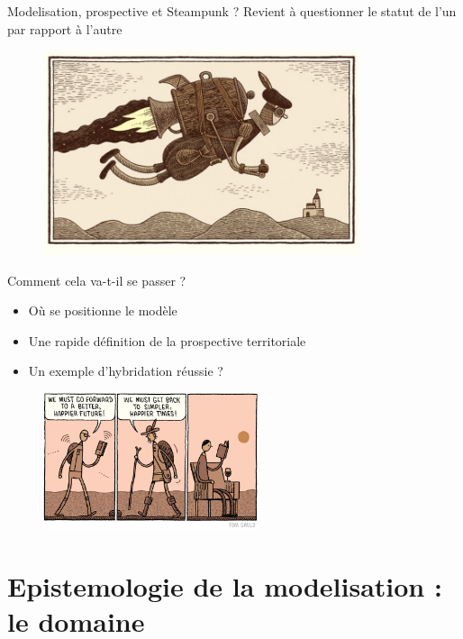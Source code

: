 \documentclass[newPxFont]{beamer}
\begin{document}
\begin{frame}[c]{Modelisation, prospective et Steampunk ?}
  \vspace{-1cm}
  Revient à questionner le statut de l'un par rapport à l'autre
  \begin{figure}
    \includegraphics[height=6cm]{img/a_Tom-Gauld-jetpack.jpg}
  \end{figure}
\end{frame}

\begin{frame}[c]{Comment cela va-t-il se passer ?}
  \vspace{-1cm}
  \begin{itemize}
    \item Où se positionne le modèle
    \item Une rapide définition de la prospective territoriale
    \item Un exemple d'hybridation réussie ?
  \end{itemize}

  \begin{figure}
    \includegraphics[height=4cm]{./img/a_Tom-Gauld-walk.jpg}
  \end{figure}
\end{frame}

\section{Epistemologie de la modelisation : le domaine}

\end{document}
